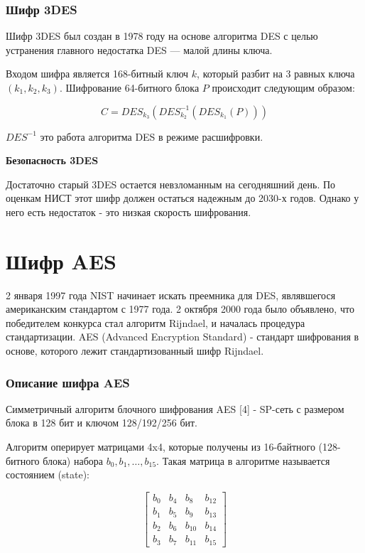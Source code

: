 \documentclass[colorthm]{./civarticle}
\begin{document}
\subsubsection{Шифр 3DES}

Шифр 3DES был создан в 1978 году на основе алгоритма DES с целью устранения главного недостатка DES — малой длины ключа.

Входом шифра является 168-битный ключ $k$, который разбит на 3 равных ключа$(k_1, k_2, k_3)$. Шифрование 64-битного блока $P$ происходит следующим образом: 

\begin{equation}
    C = DES_{k_3}(DES^{-1}_{k_2}(DES_{k_1}(P)))
\end{equation}

$DES^{-1}$ это работа алгоритма DES в режиме расшифровки.

\textbf{Безопасность 3DES}

Достаточно старый 3DES остается невзломанным на сегодняшний день. По оценкам НИСТ этот шифр должен остаться надежным до 2030-х годов. Однако у него есть недостаток - это низкая скорость шифрования.

\section{Шифр AES}
2 января 1997 года NIST начинает искать преемника для DES, являвшегося американским стандартом с 1977 года. 2 октября 2000 года было объявлено, что победителем конкурса стал алгоритм Rijndael, и началась процедура стандартизации. AES (Advanced Encryption Standard) - стандарт шифрования в основе, которого лежит стандартизованный шифр Rijndael.

\subsubsection{Описание шифра AES}
Симметричный алгоритм блочного шифрования AES [4] -  SP-сеть с размером блока в 128 бит и ключом 128/192/256 бит.

Алгоритм оперирует матрицами 4x4, которые получены из 16-байтного (128-битного блока) набора $b_0, b_1, \dots, b_{15}$. Такая матрица в алгоритме называется состоянием (state):

\begin{equation}
    \left[\begin{array}{llll}
    b_0 & b_4 & b_8 & b_{12} \\
    b_1 & b_5 & b_9 & b_{13} \\
    b_2 & b_6 & b_{10} & b_{14} \\
    b_3 & b_7 & b_{11} & b_{15}
    \end{array}\right]
\end{equation}
\end{document}
